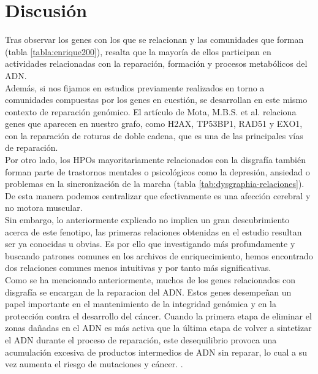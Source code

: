 \section{Discusión}

Tras observar los genes con los que se relacionan y las comunidades que forman (tabla \ref{tabla:enrique200}), resalta que la mayoría de ellos participan en actividades relacionadas con la reparación, formación y procesos metabólicos del ADN.\\

Además, si nos fijamos en estudios previamente realizados en torno a comunidades compuestas por los genes en cuestión, se desarrollan en este mismo contexto de reparación genómico. El artículo de Mota, M.B.S. et al. \cite{Mota2019} relaciona genes que aparecen en nuestro grafo, como H2AX, TP53BP1, RAD51 y EXO1, con la reparación de roturas de doble cadena, que es una de las principales vías de reparación.\\

Por otro lado, los HPOs mayoritariamente relacionados con la disgrafía también forman parte de trastornos mentales o psicológicos como la depresión, ansiedad o problemas en la sincronización de la marcha (tabla \ref{tab:dysgraphia-relaciones}). De esta manera podemos centralizar que efectivamente es una afección cerebral y no motora muscular.\\

Sin embargo, lo anteriormente explicado no implica un gran descubrimiento acerca de este fenotipo, las primeras relaciones obtenidas en el estudio resultan ser ya conocidas u obvias. Es por ello que investigando más profundamente y buscando patrones comunes en los archivos de enriquecimiento, hemos encontrado dos relaciones comunes menos intuitivas y por tanto más significativas.\\

Como se ha mencionado anteriormente, muchos de los genes relacionados con disgrafía se encargan de la reparacion del ADN. Estos genes desempeñan un papel importante en el mantenimiento de la integridad genómica y en la protección contra el desarrollo del cáncer. Cuando la primera etapa de eliminar el zonas dañadas en el ADN es más activa que la última etapa de volver a sintetizar el ADN durante el proceso de reparación, este desequilibrio provoca una acumulación excesiva de productos intermedios de ADN sin reparar, lo cual a su vez aumenta el riesgo de mutaciones y cáncer. \cite{Song2012}.\\

